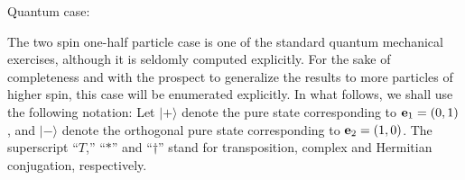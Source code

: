 {%


{Quantum case:}

The two spin one-half particle case is one of the standard quantum mechanical exercises, although
it is seldomly computed explicitly.
For the sake of completeness and with the prospect to generalize the results to more particles of higher spin,
this case will be enumerated explicitly.
In what follows, we shall use the following notation:
Let
$
\vert +\rangle
$
denote the pure state corresponding to
$ {   {\bf e}}_1 =(0,1)
$,
and
$
\vert -\rangle $ denote the orthogonal pure state
corresponding to
${   {\bf e}}_2 =(1,0)
$.
The superscript
``$T$,''
``$\ast$'' and
``$\dagger$'' stand for transposition, complex and Hermitian conjugation, respectively.

}

